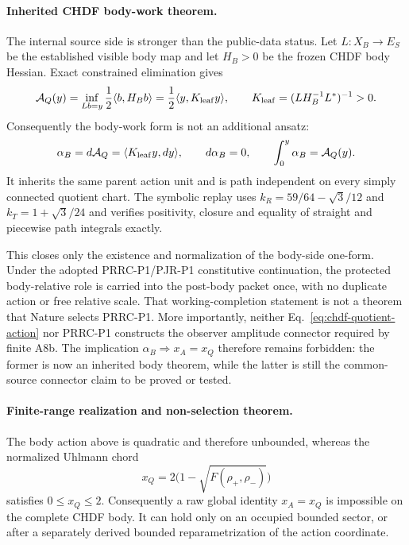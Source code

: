 \paragraph{Inherited CHDF body-work theorem.}
The internal source side is stronger than the public-data status. Let
$L:X_B\rightarrow E_S$ be the established visible body map and let $H_B>0$ be
the frozen CHDF body Hessian. Exact constrained elimination gives
\begin{equation}
 \mathcal A_Q(y)=\inf_{Lb=y}\frac12\langle b,H_Bb\rangle
 =\frac12\langle y,K_{\rm leaf}y\rangle,
 \qquad K_{\rm leaf}=(LH_B^{-1}L^*)^{-1}>0.
 \label{eq:chdf-quotient-action}
\end{equation}
Consequently the body-work form is not an additional ansatz:
\begin{equation}
 \alpha_B=d\mathcal A_Q
 =\langle K_{\rm leaf}y,dy\rangle,
 \qquad d\alpha_B=0,
 \qquad \int_{0}^{y}\alpha_B=\mathcal A_Q(y).
 \label{eq:chdf-exact-body-work}
\end{equation}
It inherits the same parent action unit and is path independent on every
simply connected quotient chart. The symbolic replay uses
$k_R=59/64-\sqrt3/12$ and $k_T=1+\sqrt3/24$ and verifies positivity, closure
and equality of straight and piecewise path integrals exactly.

This closes only the existence and normalization of the body-side one-form.
Under the adopted PRRC-P1/PJR-P1 constitutive continuation, the protected
body-relative role is carried into the post-body packet once, with no duplicate
action or free relative scale. That working-completion statement is not a
theorem that Nature selects PRRC-P1. More importantly, neither
Eq.~\eqref{eq:chdf-quotient-action} nor PRRC-P1 constructs the observer
amplitude connector required by finite A8b. The implication
$\alpha_B\Rightarrow x_A=x_Q$ therefore remains forbidden: the former is now
an inherited body theorem, while the latter is still the common-source
connector claim to be proved or tested.

\paragraph{Finite-range realization and non-selection theorem.}
The body action above is quadratic and therefore unbounded, whereas the
normalized Uhlmann chord
\begin{equation}
 x_Q=2\bigl(1-\sqrt{F(\rho_+,\rho_-)}\bigr)
 \label{eq:uhlmannchordbound}
\end{equation}
satisfies $0\leq x_Q\leq2$. Consequently a raw global identity $x_A=x_Q$
is impossible on the complete CHDF body. It can hold only on an occupied
bounded sector, or after a separately derived bounded reparametrization of
the action coordinate.

